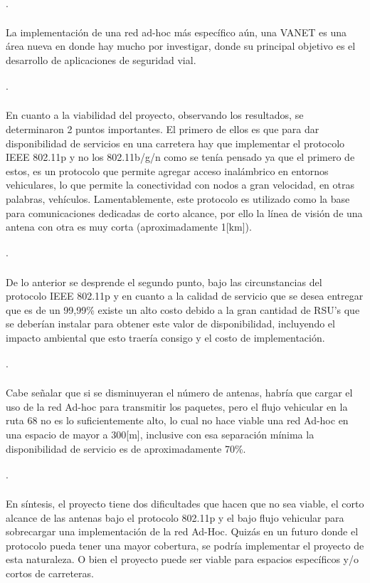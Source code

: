 \documentclass[12pt]{article}
\begin{document}
\paragraph{$\cdot$}La implementación de una red ad-hoc más específico aún, una VANET es una área nueva 
en donde hay mucho por investigar, donde su principal objetivo es el desarrollo de aplicaciones de 
seguridad vial.
\paragraph{$\cdot$}En cuanto a la viabilidad del proyecto, observando los resultados, se determinaron 
2 puntos importantes. El primero de ellos es que para dar disponibilidad de servicios en una carretera 
hay que implementar el protocolo IEEE 802.11p y no los 802.11b/g/n  como se tenía pensado ya que el 
primero de estos, es un protocolo que permite agregar acceso inalámbrico en entornos vehiculares, 
lo que permite la conectividad con nodos a gran velocidad, en otras palabras, vehículos. Lamentablemente, 
este protocolo es utilizado como la base para comunicaciones dedicadas de corto alcance, por ello la línea 
de visión de una antena con otra es muy corta (aproximadamente 1[km]).
\paragraph{$\cdot$}De lo anterior se desprende el segundo punto, bajo las circunstancias del protocolo 
IEEE 802.11p y en cuanto a la calidad de servicio que se desea entregar que es de un 99,99\% existe un 
alto costo debido a la gran cantidad de RSU’s que se deberían instalar para obtener este valor de 
disponibilidad, incluyendo el impacto ambiental que esto traería consigo y el costo de implementación.
\paragraph{$\cdot$}Cabe señalar que si se disminuyeran el número de antenas, habría que cargar el uso 
de la red Ad-hoc para transmitir los paquetes, pero el flujo vehicular en la ruta 68 no es lo 
suficientemente alto, lo cual no hace viable una red Ad-hoc en una espacio de mayor a 300[m], 
inclusive con esa separación mínima la disponibilidad de servicio es de aproximadamente 70\%.
\paragraph{$\cdot$}En síntesis, el proyecto tiene dos dificultades que hacen que no sea viable, el 
corto alcance de las antenas bajo el protocolo 802.11p y el bajo flujo vehicular para sobrecargar una 
implementación de la red Ad-Hoc. Quizás en un futuro donde el protocolo pueda tener una mayor cobertura, 
se podría implementar el proyecto de esta naturaleza.  O bien el proyecto puede ser viable para 
espacios específicos y/o cortos de carreteras.
\end{document}
